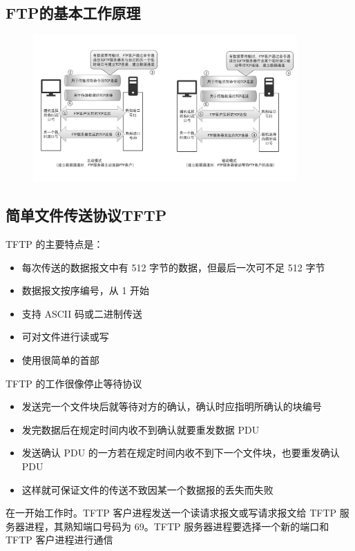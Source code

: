 \documentclass[cs4size,a4paper,10pt]{ctexart}
\begin{document}
	\subsection{FTP的基本工作原理}
	\begin{figure}[H]
		\centering
		\includegraphics[width=0.9\textwidth]{img/6.2.2}
	\end{figure}

	\subsection{简单文件传送协议TFTP}
	TFTP 的主要特点是：
	\begin{itemize}
		\item 每次传送的数据报文中有 512 字节的数据，但最后一次可不足 512 字节
		\item 数据报文按序编号，从 1 开始
		\item 支持 ASCII 码或二进制传送
		\item 可对文件进行读或写
		\item 使用很简单的首部
	\end{itemize}

	TFTP 的工作很像停止等待协议
	\begin{itemize}
		\item 发送完一个文件块后就等待对方的确认，确认时应指明所确认的块编号
		\item 发完数据后在规定时间内收不到确认就要重发数据 PDU
		\item 发送确认 PDU 的一方若在规定时间内收不到下一个文件块，也要重发确认 PDU
		\item 这样就可保证文件的传送不致因某一个数据报的丢失而失败
	\end{itemize}

	在一开始工作时。TFTP 客户进程发送一个读请求报文或写请求报文给 TFTP 服务器进程，其熟知端口号码为 69。TFTP 服务器进程要选择一个新的端口和 TFTP 客户进程进行通信
\end{document}

